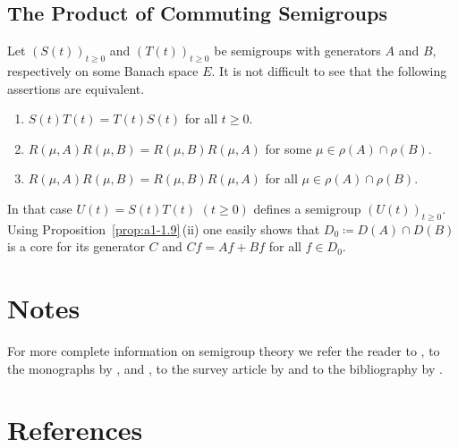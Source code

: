 \subsection{The Product of Commuting Semigroups}\label{subsec:a1-3.9}%
Let $(S(t))_{t\geq 0}$ and $(T(t))_{t\geq 0}$ be semigroups with generators $A$ and $B$, respectively on some Banach space $E$.
It is not difficult to see that the following assertions are equivalent.
\begin{enumerate}[\upshape (a)]

\item  
$S(t)T(t) = T(t)S(t)$ for all $t \geq 0$.

\item 
$R(\mu,A)R(\mu,B) = R(\mu,B)R(\mu,A)$ for some $\mu \in \rho(A) \cap \rho(B)$.

\item 
$R(\mu,A)R(\mu,B) = R(\mu,B)R(\mu,A)$ for all $\mu \in \rho(A) \cap \rho(B)$.

\end{enumerate}
In that case $U(t) = S(t)T(t)$ $(t \geq 0)$ defines a semigroup $(U(t))_{t\geq 0}$.
Using %
Proposition~\ref{prop:a1-1.9}\,(ii) one easily shows that $D_{0} \coloneq D(A) \cap D(B)$ is a core for its generator $C$ and $Cf = Af + Bf$ for all $f \in D_{0}$.
\section*{Notes}
For more complete information on semigroup theory we refer the reader to \textcite{hillephillips:1957}, to the monographs by \textcite{davies:1980}, 
\textcite{goldstein:1985a} and \textcite{pazy:1983}, to the survey article by \textcite{kreinkhazan:1985} and to the bibliography by 
\textcite{goldstein:1985b}. 
\section*{References}
{\RaggedRight
  \printbibliography[heading=none]
 }
